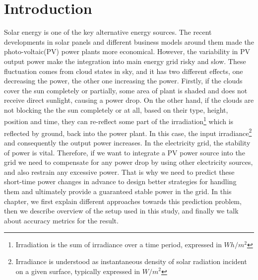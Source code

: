 \newcommand{\package}{\emph}
\chapter{Introduction}
Solar energy is one of the key alternative energy sources. The recent developments in solar panels and different business models around them made the photo-voltaic(PV) power plants more economical. However, the variability in PV output power make the integration into main energy grid risky and slow\cite{solar_variable}. These fluctuation comes from cloud states in sky, and it has two different effects, one decreasing the power, the other one increasing the power. Firstly, if the clouds cover the sun completely or partially, some area of plant is shaded and does not receive direct sunlight, causing a power drop. On the other hand, if the clouds are not blocking the the sun completely or at all, based on their type, height, position and time, they can re-reflect some part of the irradiation\footnote{Irradiation is the sum of irradiance over a time period, expressed in  $Wh/m^2$} which is reflected by ground, back into the power plant. In this case, the input irradiance\footnote{Irradiance is understood as instantaneous density of solar radiation incident on a given surface, typically expressed in $W/m^2$} and consequently the output power increases. In the electricity grid, the stability of power is vital. Therefore, if we want to integrate a PV power source into the grid we need to compensate for any power drop by using other electricity sources, and also restrain any excessive power. That is why we need to predict these short-time power changes in advance to design better strategies for handling them and ultimately provide a guaranteed stable power in the grid. In this chapter, we first explain different approaches towards this prediction problem, then we describe overview of the setup used in this study, and finally we talk about accuracy metrics for the result. 


